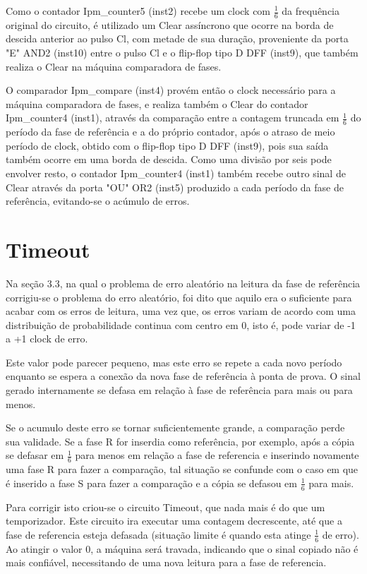 \documentclass[12pt,a4paper,openany]{abntex2}
\begin{document}
Como o contador Ipm\_counter5 (inst2) recebe um clock com $\frac{1}{6}$ da
frequência original do circuito, é utilizado um Clear assíncrono que ocorre na borda de descida anterior ao pulso Cl, com metade de sua duração, proveniente da porta "E" AND2 (inst10) entre o pulso Cl e o flip-flop tipo D DFF (inst9), que também realiza o Clear na máquina comparadora de fases.

O comparador Ipm\_compare (inst4) provém então o clock necessário para a
máquina comparadora de fases, e realiza também o Clear do contador Ipm\_counter4 (inst1), através da comparação entre a contagem truncada em $\frac{1}{6}$ do período da fase de referência e a do próprio contador, após o atraso de meio período de clock, obtido com o flip-flop tipo D DFF (inst9), pois sua saída também ocorre em uma borda de descida. Como uma divisão por seis pode envolver resto, o contador Ipm\_counter4 (inst1) também recebe outro sinal de Clear através da porta "OU" OR2 (inst5) produzido a cada período da fase de referência, evitando-se o acúmulo de erros.

\section{Timeout}

Na seção 3.3, na qual o problema de erro aleatório na leitura da fase de referência corrigiu-se o problema do erro aleatório, foi dito que aquilo era o suficiente para acabar com os erros de leitura, uma vez que, os erros variam de acordo com uma distribuição de probabilidade continua com centro em 0, isto é, pode variar de -1 a +1 clock de erro.

Este valor pode parecer pequeno, mas este erro se repete a cada novo período enquanto se espera a conexão da nova fase de referência à ponta de prova. O sinal gerado internamente se defasa em relação à fase de referência para mais ou para menos.

Se o acumulo deste erro se tornar suficientemente grande, a comparação perde sua validade. Se a fase R for inserdia como referência, por exemplo, após a cópia se defasar em $\frac{1}{6}$ para menos em relação a fase de referencia e inserindo novamente uma fase R para fazer a comparação, tal situação se confunde com o caso em que é inserido a fase S para fazer a comparação e a cópia se defasou em $\frac{1}{6}$ para mais.

Para corrigir isto criou-se o circuito Timeout, que nada mais é do que um temporizador. Este circuito ira executar uma contagem decrescente, até que a fase de referencia esteja defasada (situação limite é quando esta atinge $\frac{1}{6}$ de erro). Ao atingir o valor 0, a máquina será travada, indicando que o sinal copiado não é mais confiável, necessitando de uma nova leitura para a fase de referencia.
\end{document}
